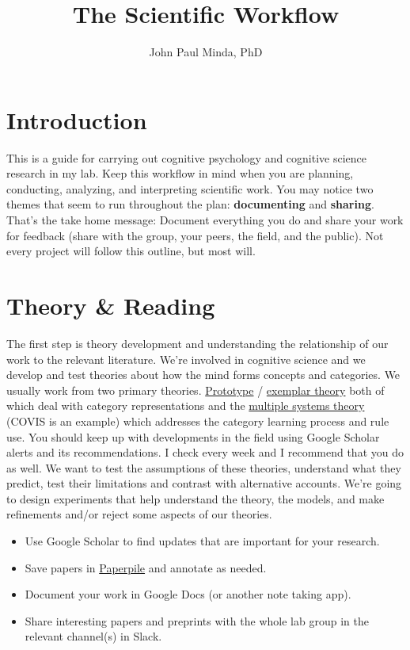 \documentclass{article}
\title{The Scientific Workflow}
\author{John Paul Minda, PhD}
\begin{document}
\maketitle
\section{Introduction} 
This is a guide for carrying out cognitive psychology and cognitive science research in my lab. Keep this workflow in mind when you are planning, conducting, analyzing, and interpreting scientific work. You may notice two themes that seem to run throughout the plan: \textbf{documenting} and \textbf{sharing}. That's the take home message: Document everything you do and share your work for feedback (share with the group, your peers, the field, and the public). Not every project will follow this outline, but most will.  

\section{Theory \& Reading} 
The first step is theory development and understanding the relationship of our work to the relevant literature. We're involved in cognitive science and we develop and test theories about how the mind forms concepts and categories. We usually work from two primary theories. \href{https://mindalab.files.wordpress.com/2019/02/mindasmithchapterfinal.pdf}{Prototype} / \href{https://link.springer.com/article/10.3758/s13423-015-0834-3}{exemplar theory} both of which deal with category representations and the \href{https://mindalab.files.wordpress.com/2019/02/minda-and-miles-2010-the-influence-of-verbal-and-nonverbal-processing-on-category-learning.pdf}{multiple systems theory} (COVIS is an example) which addresses the category learning process and rule use. You should keep up with developments in the field using Google Scholar alerts and its recommendations. I check every week and I recommend that you do as well. 
We want to test the assumptions of these theories, understand what they predict, test their limitations and contrast with alternative accounts. We're going to design experiments that help understand the theory, the models, and make refinements and/or reject some aspects of our theories.

\begin{itemize}
\item Use Google Scholar to find updates that are important for your research.
\item Save papers in \href{https://paperpile.com/welcome}{Paperpile} and annotate as needed.
\item Document your work in Google Docs (or another note taking app).
\item Share interesting papers and preprints with the whole lab group in the relevant channel(s) in Slack.
\end{itemize}
\end{document}
